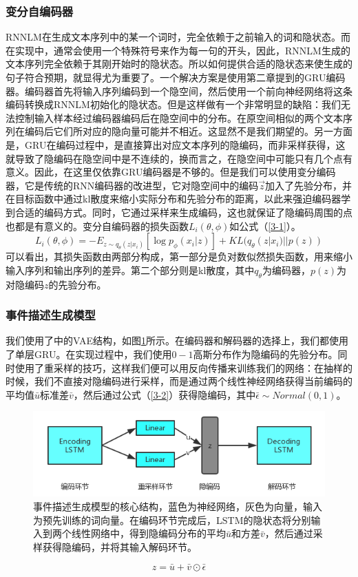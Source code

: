 \documentclass[]{template}
\begin{document}
\subsubsection{变分自编码器}
RNNLM在生成文本序列中的某一个词时，完全依赖于之前输入的词和隐状态。而在实现中，通常会使用一个特殊符号来作为每一句的开头，因此，RNNLM生成的文本序列完全依赖于其刚开始时的隐状态。所以如何提供合适的隐状态来使生成的句子符合预期，就显得尤为重要了。一个解决方案是使用第二章提到的GRU编码器。编码器首先将输入序列编码到一个隐空间，然后使用一个前向神经网络将这条编码转换成RNNLM初始化的隐状态。但是这样做有一个非常明显的缺陷：我们无法控制输入样本经过编码器编码后在隐空间中的分布。在原空间相似的两个文本序列在编码后它们所对应的隐向量可能并不相近。这显然不是我们期望的。另一方面是，GRU在编码过程中，是直接算出对应文本序列的隐编码，而非采样获得，这就导致了隐编码在隐空间中是不连续的，换而言之，在隐空间中可能只有几个点有意义。因此，在这里仅依靠GRU编码器是不够的。但是我们可以使用变分编码器，它是传统的RNN编码器的改进型，它对隐空间中的编码\(\overrightarrow{z}\)加入了先验分布，并在目标函数中通过kl散度来缩小实际分布和先验分布的距离，以此来强迫编码器学到合适的编码方式。同时，它通过采样来生成编码，这也就保证了隐编码周围的点也都是有意义的。变分自编码器的损失函数$L_i(\theta,\phi)$如公式（\ref{3-1}）。
\begin{equation}\label{3-1}
    L_i(\theta,\phi)=-E_{z\sim q_\theta(z|x_i)}[\log p_\phi(x_i|z)]+KL (q_\theta(z|x_i)||p(z))
\end{equation}
可以看出，其损失函数由两部分构成，第一部分是负对数似然损失函数，用来缩小输入序列和输出序列的差异。第二个部分则是kl散度，其中$q_\theta$为编码器，$p(z)$为对隐编码$z$的先验分布。

\subsubsection{事件描述生成模型}
我们使用了\cite{bowman_generating_2015}中的VAE结构，如图\ref{f3-2}所示。在编码器和解码器的选择上，我们都使用了单层GRU。在实现过程中，我们使用$0-1$高斯分布作为隐编码的先验分布。同时使用了重采样\cite{kingma_auto-encoding_2013}的技巧，这样我们便可以用反向传播来训练我们的网络：在抽样的时候，我们不直接对隐编码进行采样，而是通过两个线性神经网络获得当前编码的平均值$\bar{u}$标准差$\bar{v}$，然后通过公式（\ref{3-2}）获得隐编码，其中$\bar\epsilon \sim Normal(0,1)$。
\begin{figure}[htb]\label{f3-2}
    \centering
    \includegraphics[width=11.3cm]{vae.png}
    \caption{事件描述生成模型的核心结构，蓝色为神经网络，灰色为向量，输入为预先训练的词向量。在编码环节完成后，LSTM的隐状态将分别输入到两个线性网络中，得到隐编码分布的平均$\bar{u}$和方差$\bar{v}$，然后通过采样获得隐编码，并将其输入解码环节。}
\end{figure}
\begin{equation}\label{3-2}
    z=\bar{u}+\bar{v}\odot \bar\epsilon
\end{equation}
\end{document}
